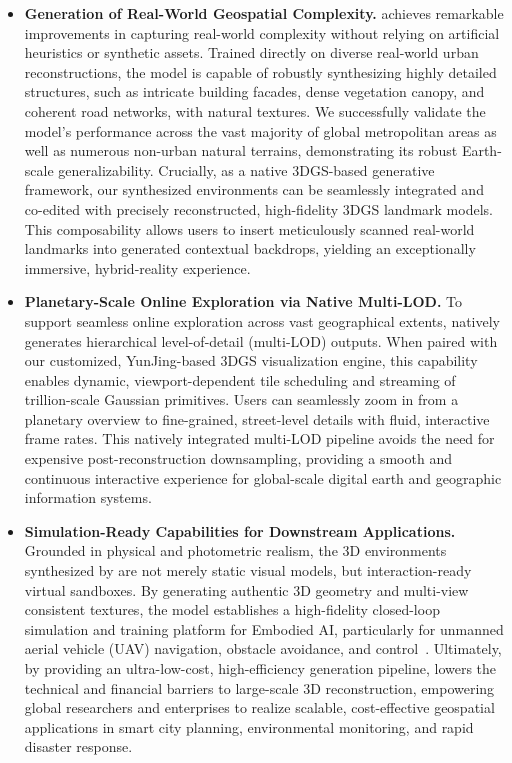 \begin{itemize}
    \item \textbf{Generation of Real-World Geospatial Complexity.} \method{} achieves remarkable improvements in capturing real-world complexity without relying on artificial heuristics or synthetic assets. Trained directly on diverse real-world urban reconstructions, the model is capable of robustly synthesizing highly detailed structures, such as intricate building facades, dense vegetation canopy, and coherent road networks, with natural textures. We successfully validate the model's performance across the vast majority of global metropolitan areas as well as numerous non-urban natural terrains, demonstrating its robust Earth-scale generalizability. Crucially, as a native 3DGS-based generative framework, our synthesized environments can be seamlessly integrated and co-edited with precisely reconstructed, high-fidelity 3DGS landmark models. This composability allows users to insert meticulously scanned real-world landmarks into generated contextual backdrops, yielding an exceptionally immersive, hybrid-reality experience.
    
    \item \textbf{Planetary-Scale Online Exploration via Native Multi-LOD.} To support seamless online exploration across vast geographical extents, \method{} natively generates hierarchical level-of-detail (multi-LOD) outputs. When paired with our customized, YunJing-based 3DGS visualization engine, this capability enables dynamic, viewport-dependent tile scheduling and streaming of trillion-scale Gaussian primitives. Users can seamlessly zoom in from a planetary overview to fine-grained, street-level details with fluid, interactive frame rates. This natively integrated multi-LOD pipeline avoids the need for expensive post-reconstruction downsampling, providing a smooth and continuous interactive experience for global-scale digital earth and geographic information systems.
    
    \item \textbf{Simulation-Ready Capabilities for Downstream Applications.} Grounded in physical and photometric realism, the 3D environments synthesized by \method{} are not merely static visual models, but interaction-ready virtual sandboxes. By generating authentic 3D geometry and multi-view consistent textures, the model establishes a high-fidelity closed-loop simulation and training platform for Embodied AI, particularly for unmanned aerial vehicle (UAV) navigation, obstacle avoidance, and control~\cite{AirSim,FlightGoggles}. Ultimately, by providing an ultra-low-cost, high-efficiency generation pipeline, \method{} lowers the technical and financial barriers to large-scale 3D reconstruction, empowering global researchers and enterprises to realize scalable, cost-effective geospatial applications in smart city planning, environmental monitoring, and rapid disaster response.
\end{itemize}

